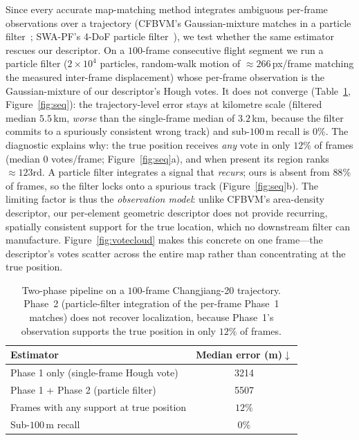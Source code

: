 \documentclass[10pt]{article}
\theoremstyle{plain}
\theoremstyle{definition}
\begin{document}
Since every accurate map-matching method integrates ambiguous per-frame
observations over a trajectory (CFBVM's Gaussian-mixture matches in a particle
filter~\cite{ouyang2024cfbvm}; SWA-PF's 4-DoF particle
filter~\cite{yuan2025swapf}), we test whether the same estimator rescues our
descriptor. On a $100$-frame consecutive flight segment we run a particle filter
($2\times10^{4}$ particles, random-walk motion of $\approx\!266$\,px/frame
matching the measured inter-frame displacement) whose per-frame observation is
the Gaussian-mixture of our descriptor's Hough votes.
It does not converge (Table~\ref{tab:seq}, Figure~\ref{fig:seq}): the
trajectory-level error stays at kilometre scale (filtered median $5.5$\,km,
\emph{worse} than the single-frame median of $3.2$\,km, because the filter
commits to a spuriously consistent wrong track) and sub-$100$\,m recall is $0\%$.
The diagnostic explains why: the true position receives \emph{any} vote in only
$12\%$ of frames (median $0$ votes/frame; Figure~\ref{fig:seq}a), and when
present its region ranks $\approx\!123$rd. A particle filter integrates a signal
that \emph{recurs}; ours is absent from $88\%$ of frames, so the filter locks
onto a spurious track (Figure~\ref{fig:seq}b). The limiting factor is thus the
\emph{observation model}: unlike CFBVM's area-density descriptor, our
per-element geometric descriptor does not provide recurring, spatially
consistent support for the true location, which no downstream filter can
manufacture. Figure~\ref{fig:votecloud} makes this concrete on one frame---the
descriptor's votes scatter across the entire map rather than concentrating at
the true position.

\begin{table}[htbp]
\caption{Two-phase pipeline on a $100$-frame Changjiang-20 trajectory. Phase~2
  (particle-filter integration of the per-frame Phase~1 matches) does not
  recover localization, because Phase~1's observation supports the true position
  in only $12\%$ of frames.}
\label{tab:seq}
\centering\small
\setlength{\tabcolsep}{6pt}
\begin{tabular}{lc}
\toprule
\textbf{Estimator} & \textbf{Median error (m)$\downarrow$} \\
\midrule
Phase 1 only (single-frame Hough vote)        & 3214 \\
Phase 1 + Phase 2 (particle filter)           & 5507 \\
\midrule
Frames with any support at true position      & $12\%$ \\
Sub-$100$\,m recall                            & $0\%$ \\
\bottomrule
\end{tabular}
\end{table}
\end{document}
